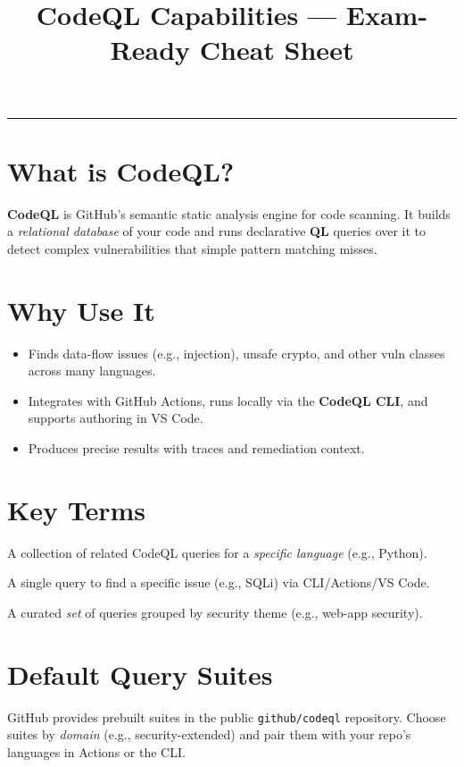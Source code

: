 \documentclass[11pt,letterpaper]{article}
\title{\vspace{-1.5em}\textbf{CodeQL Capabilities — Exam-Ready Cheat Sheet}\vspace{-0.5em}}
\date{}
\author{}
\begin{document}
\maketitle
\vspace{-1.25em}
\hrule
\vspace{0.75em}

\section{What is CodeQL?}
\textbf{CodeQL} is GitHub's semantic static analysis engine for code scanning. It builds a \emph{relational database} of your code and runs declarative \textbf{QL} queries over it to detect complex vulnerabilities that simple pattern matching misses.

\section{Why Use It}
\begin{itemize}
  \item Finds data-flow issues (e.g., injection), unsafe crypto, and other vuln classes across many languages.
  \item Integrates with GitHub Actions, runs locally via the \textbf{CodeQL CLI}, and supports authoring in VS Code.
  \item Produces precise results with traces and remediation context.
\end{itemize}

\section{Key Terms}
\begin{description}[style=unboxed,leftmargin=0cm]
  \item[QL Pack] A collection of related CodeQL queries for a \emph{specific language} (e.g., Python).
  \item[Code Query (\texttt{.ql})] A single query to find a specific issue (e.g., SQLi) via CLI/Actions/VS Code.
  \item[Query / Code Suite] A curated \emph{set} of queries grouped by security theme (e.g., web-app security).
\end{description}

\section{Default Query Suites}
GitHub provides prebuilt suites in the public \texttt{github/codeql} repository. Choose suites by \emph{domain} (e.g., security-extended) and pair them with your repo's languages in Actions or the CLI.
\end{document}
